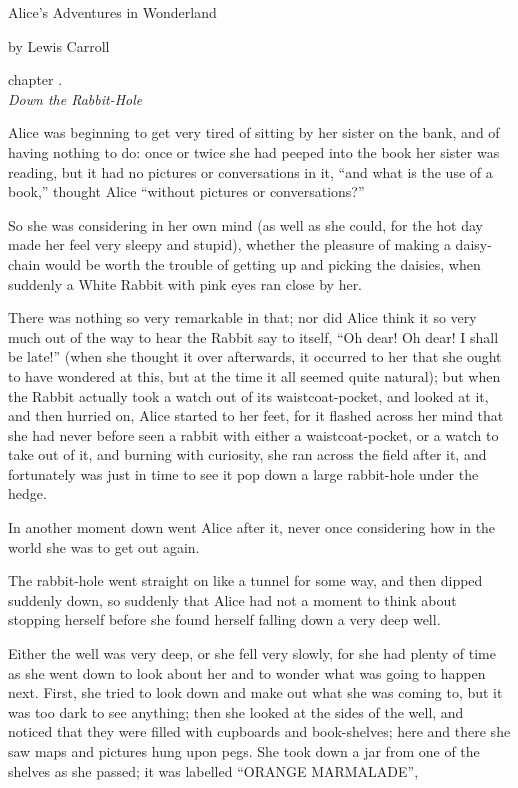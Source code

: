 \documentclass[10pt]{article}
\begin{document}
\begin{center}
    {\Huge
        Alice's Adventures in Wonderland}

    \smallskip

    {\sc\LARGE by Lewis Carroll}
    
    \bigskip
    \bigskip
    
    {\sc\Large chapter .} \\
    \smallskip
    {\large\it Down the Rabbit-Hole}    
\end{center}

\bigskip

Alice was beginning to get very tired of sitting by her sister on the bank, and of having nothing to do: once or twice she had peeped into the book her sister was reading, but it had no pictures or conversations in it, ``and what is the use of a book,'' thought Alice ``without pictures or conversations?''
    
So she was considering in her own mind (as well as she could, for the hot day made her feel very sleepy and stupid), whether the pleasure of making a daisy-chain would be worth the trouble of getting up and picking the daisies, when suddenly a White Rabbit with pink eyes ran close by her.

There was nothing so very remarkable in that; nor did Alice think it so very much out of the way to hear the Rabbit say to itself, ``Oh dear! Oh dear! I shall be late!'' (when she thought it over afterwards, it occurred to her that she ought to have wondered at this, but at the time it all seemed quite natural); but when the Rabbit actually took a watch out of its waistcoat-pocket, and looked at it, and then hurried on, Alice started to her feet, for it flashed across her mind that she had never before seen a rabbit with either a waistcoat-pocket, or a watch to take out of it, and burning with curiosity, she ran across the field after it, and fortunately was just in time to see it pop down a large rabbit-hole under the hedge.

In another moment down went Alice after it, never once considering how in the world she was to get out again.

The rabbit-hole went straight on like a tunnel for some way, and then dipped suddenly down, so suddenly that Alice had not a moment to think about stopping herself before she found herself falling down a very deep well.

Either the well was very deep, or she fell very slowly, for she had plenty of time as she went down to look about her and to wonder what was going to happen next. First, she tried to look down and make out what she was coming to, but it was too dark to see anything; then she looked at the sides of the well, and noticed that they were filled with cupboards and book-shelves; here and there she saw maps and pictures hung upon pegs. She took down a jar from one of the shelves as she passed; it was labelled ``ORANGE MARMALADE'',
\end{document}
